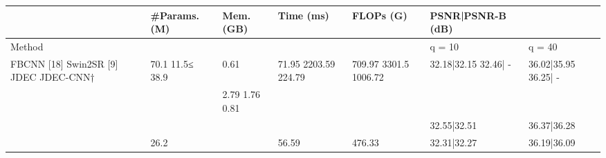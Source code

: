 \begin{tabular}{lllllll}
\toprule
 & \#Params. (M) & Mem. (GB) & Time (ms) & FLOPs (G) & PSNR|PSNR-B (dB) &  \\
\midrule
Method &  &  &  &  & q = 10 & q = 40 \\
FBCNN [18] Swin2SR [9] JDEC JDEC-CNN† & 70.1 11.5≤ 38.9 & 0.61 & 71.95 2203.59 224.79 & 709.97 3301.5 1006.72 & 32.18|32.15 32.46| - & 36.02|35.95 36.25| - \\
 &  & 2.79 1.76 0.81 &  &  &  &  \\
 &  &  &  &  & 32.55|32.51 & 36.37|36.28 \\
 & 26.2 &  & 56.59 & 476.33 & 32.31|32.27 & 36.19|36.09 \\
\bottomrule
\end{tabular}
